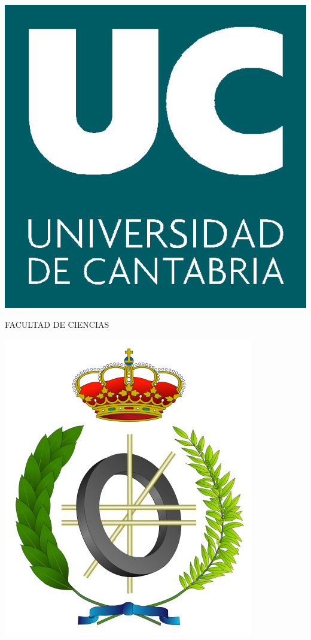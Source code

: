 \begin{titlepage}
\includegraphics[scale=0.3]{img/logo-uc.png}
\begin{center}
\Large{FACULTAD DE CIENCIAS}

\includegraphics[scale=1.1]{img/logo-ciencias.png}


\end{center}
\end{titlepage}
